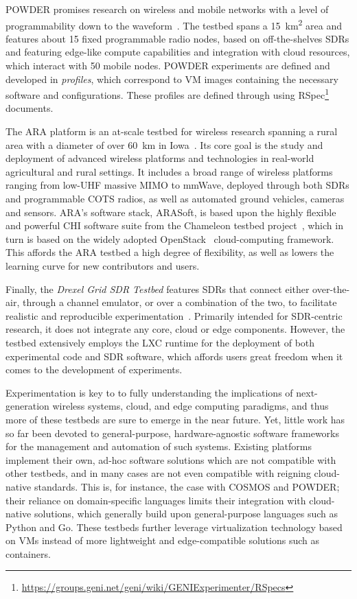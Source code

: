 \gls{POWDER} promises research on wireless and mobile networks with a level of programmability down to the waveform~\cite{powder}.
The testbed spans a \SI{15}{\kilo\meter\squared} area and features about \num{15} fixed programmable radio nodes, based on off-the-shelves \glspl{SDR} and featuring edge-like compute capabilities and integration with cloud resources, which interact with \num{50} mobile nodes.
\gls{POWDER} experiments are defined and developed in \emph{profiles}, which correspond to \gls{VM} images containing the necessary software and configurations.
These profiles are defined through using \gls{RSpec}\footnote{\url{https://groups.geni.net/geni/wiki/GENIExperimenter/RSpecs}} documents.

The \gls{ARA} platform is an at-scale testbed for wireless research spanning a rural area with a diameter of over \SI{60}{\kilo\meter} in Iowa~\cite{zhang2022ara}.
Its core goal is the study and deployment of advanced wireless platforms and technologies in real-world agricultural and rural settings.
It includes a broad range of wireless platforms ranging from low-\gls{UHF} massive \gls{MIMO} to \unit{\milli\meter}Wave, deployed through both \glspl{SDR} and programmable \gls{COTS} radios, as well as automated ground vehicles, cameras and sensors.
\gls{ARA}'s software stack, ARASoft, is based upon the highly flexible and powerful \gls{CHI} software suite from the Chameleon testbed project~\cite{keahey2020lessons}, which in turn is based on the widely adopted OpenStack~\cite{openstack} cloud-computing framework.
This affords the \gls{ARA} testbed a high degree of flexibility, as well as lowers the learning curve for new contributors and users.

Finally, the \emph{Drexel Grid \gls{SDR} Testbed} features \glspl{SDR} that connect either over-the-air, through a channel emulator, or over a combination of the two, to facilitate realistic and reproducible experimentation~\cite{DrexelGrid}.
Primarily intended for \gls{SDR}-centric research, it does not integrate any core, cloud or edge components.
However, the testbed extensively employs the \gls{LXC} runtime for the deployment of both experimental code and \gls{SDR} software, which affords users great freedom when it comes to the development of experiments.

Experimentation is key to to fully understanding the implications of next-generation wireless systems, cloud, and edge computing paradigms, and thus more of these testbeds are sure to emerge in the near future.
Yet, little work has so far been devoted to general-purpose, hardware-agnostic software frameworks for the management and automation of such systems.
Existing platforms implement their own, ad-hoc software solutions which are not compatible with other testbeds, and in many cases are not even compatible with reigning cloud-native standards.
This is, for instance, the case with \gls{COSMOS} and \gls{POWDER}; their reliance on domain-specific languages limits their integration with cloud-native solutions, which generally build upon general-purpose languages such as Python and Go.
These testbeds further leverage virtualization technology based on \glspl{VM} instead of more lightweight and edge-compatible solutions such as containers.

